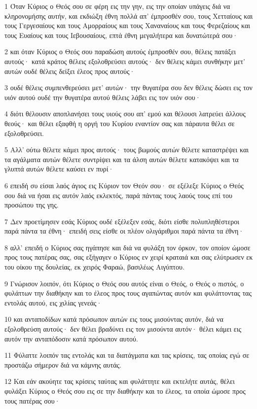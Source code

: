 \par 1 Όταν Κύριος ο Θεός σου σε φέρη εις την γην, εις την οποίαν υπάγεις διά να κληρονομήσης αυτήν, και εκδιώξη έθνη πολλά απ' έμπροσθέν σου, τους Χετταίους και τους Γεργεσαίους και τους Αμορραίους και τους Χαναναίους και τους Φερεζαίους και τους Ευαίους και τους Ιεβουσαίους, επτά έθνη μεγαλήτερα και δυνατώτερά σου·
\par 2 και όταν Κύριος ο Θεός σου παραδώση αυτούς έμπροσθέν σου, θέλεις πατάξει αυτούς· κατά κράτος θέλεις εξολοθρεύσει αυτούς· δεν θέλεις κάμει συνθήκην μετ' αυτών ουδέ θέλεις δείξει έλεος προς αυτούς·
\par 3 ουδέ θέλεις συμπενθερεύσει μετ' αυτών· την θυγατέρα σου δεν θέλεις δώσει εις τον υιόν αυτού ουδέ την θυγατέρα αυτού θέλεις λάβει εις τον υιόν σου·
\par 4 διότι θέλουσιν αποπλανήσει τους υιούς σου απ' εμού και θέλουσι λατρεύει άλλους θεούς· και θέλει εξαφθή η οργή του Κυρίου εναντίον σας και πάραυτα θέλει σε εξολοθρεύσει.
\par 5 Αλλ' ούτω θέλετε κάμει προς αυτούς· τους βωμούς αυτών θέλετε καταστρέψει και τα αγάλματα αυτών θέλετε συντρίψει και τα άλση αυτών θέλετε κατακόψει και τα γλυπτά αυτών θέλετε καύσει εν πυρί·
\par 6 επειδή συ είσαι λαός άγιος εις Κύριον τον Θεόν σου· σε εξέλεξε Κύριος ο Θεός σου διά να ήσαι εις αυτόν λαός εκλεκτός, παρά πάντας τους λαούς τους επί του προσώπου της γης.
\par 7 Δεν προετίμησεν εσάς Κύριος ουδέ εξέλεξεν εσάς, διότι είσθε πολυπληθέστεροι παρά πάντα τα έθνη· επειδή σεις είσθε οι πλέον ολιγάριθμοι παρά πάντα τα έθνη·
\par 8 αλλ' επειδή ο Κύριος σας ηγάπησε και διά να φυλάξη τον όρκον, τον οποίον ώμοσε προς τους πατέρας σας, σας εξήγαγεν ο Κύριος εν χειρί κραταιά και σας ελύτρωσεν εκ του οίκου της δουλείας, εκ χειρός Φαραώ, βασιλέως Αιγύπτου.
\par 9 Γνώρισον λοιπόν, ότι Κύριος ο Θεός σου αυτός είναι ο Θεός, ο Θεός ο πιστός, ο φυλάττων την διαθήκην και το έλεος προς τους αγαπώντας αυτόν και φυλάττοντας τας εντολάς αυτού, εις χιλίας γενεάς·
\par 10 και ανταποδίδων κατά πρόσωπον αυτών εις τους μισούντας αυτόν, διά να εξολοθρεύση αυτούς· δεν θέλει βραδύνει εις τον μισούντα αυτόν· θέλει κάμει εις αυτόν την ανταπόδοσιν κατά πρόσωπον αυτού.
\par 11 Φύλαττε λοιπόν τας εντολάς και τα διατάγματα και τας κρίσεις, τας οποίας εγώ σε προστάζω σήμερον διά να κάμνης αυτάς.
\par 12 Και εάν ακούητε τας κρίσεις ταύτας και φυλάττητε και εκτελήτε αυτάς, θέλει φυλάξει Κύριος ο Θεός σου εις σε την διαθήκην και το έλεος, τα οποία ώμοσε προς τους πατέρας σου·
